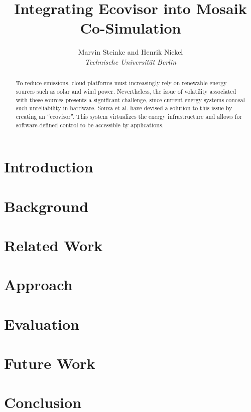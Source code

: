 \documentclass[a4paper]{IEEEtran}
\begin{document}
\title{Integrating Ecovisor into Mosaik Co-Simulation}

\author{Marvin Steinke and Henrik Nickel\\\textit{Technische Universität Berlin}}

\maketitle

\begin{abstract}
    To reduce emissions, cloud platforms must increasingly rely on renewable
    energy sources such as solar and wind power. Nevertheless, the issue of
    volatility associated with these sources presents a significant challenge,
    since current energy systems conceal such unreliability in hardware. Souza
    et al. have devised a solution to this issue by creating an
    \enquote{ecovisor}. This system virtualizes the energy infrastructure and
    allows for software-defined control to be accessible by applications.
\end{abstract}

\section{Introduction}
\label{sec:introduction}


\section{Background}
\label{sec:background}


\section{Related Work}
\label{sec:related_work}


\section{Approach}
\label{sec:approach}


\section{Evaluation}
\label{sec:evaluation}


\section{Future Work}
\label{sec:future_work}


\section{Conclusion}
\label{sec:conclusion}




\end{document}
